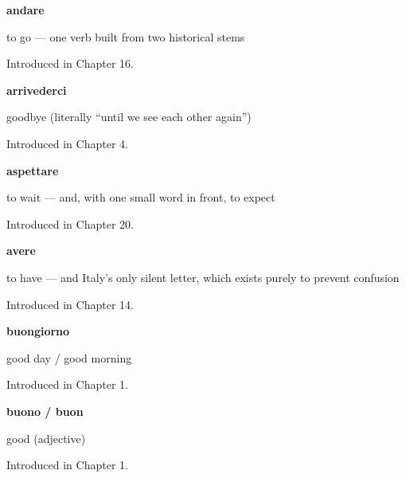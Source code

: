 \noindent\begin{minipage}[t]{\linewidth}
\raggedright
\textbf{andare}\par
\small to go — one verb built from two historical stems\par
\footnotesize Introduced in Chapter 16.
\end{minipage}\par\medskip

\noindent\begin{minipage}[t]{\linewidth}
\raggedright
\textbf{arrivederci}\par
\small goodbye (literally \textquotedblleft{}until we see each other again\textquotedblright{})\par
\footnotesize Introduced in Chapter 4.
\end{minipage}\par\medskip

\noindent\begin{minipage}[t]{\linewidth}
\raggedright
\textbf{aspettare}\par
\small to wait — and, with one small word in front, to expect\par
\footnotesize Introduced in Chapter 20.
\end{minipage}\par\medskip

\noindent\begin{minipage}[t]{\linewidth}
\raggedright
\textbf{avere}\par
\small to have — and Italy's only silent letter, which exists purely to prevent confusion\par
\footnotesize Introduced in Chapter 14.
\end{minipage}\par\medskip

\noindent\begin{minipage}[t]{\linewidth}
\raggedright
\textbf{buongiorno}\par
\small good day / good morning\par
\footnotesize Introduced in Chapter 1.
\end{minipage}\par\medskip

\noindent\begin{minipage}[t]{\linewidth}
\raggedright
\textbf{buono / buon}\par
\small good (adjective)\par
\footnotesize Introduced in Chapter 1.
\end{minipage}\par\medskip

